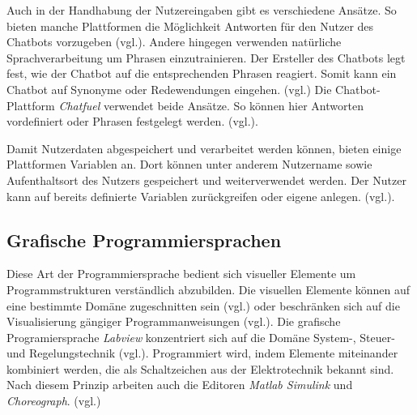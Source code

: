 Auch in der Handhabung der Nutzereingaben gibt es verschiedene Ansätze. So bieten manche Plattformen die Möglichkeit Antworten für den Nutzer des Chatbots vorzugeben (vgl.\cite{Chatfuel3:online}\cite{WelcomeM66:online}). Andere hingegen verwenden natürliche Sprachverarbeitung um Phrasen einzutrainieren. Der Ersteller des Chatbots legt fest, wie der Chatbot auf die entsprechenden Phrasen reagiert. Somit kann ein Chatbot auf Synonyme oder Redewendungen eingehen. (vgl.\cite{BotsifyC64:online}\cite{Dialogfl40:online}\cite{KatalogI56:online}) Die Chatbot-Plattform \emph{Chatfuel} verwendet beide Ansätze. So können hier Antworten vordefiniert oder Phrasen festgelegt werden. (vgl.\cite{Chatfuel3:online}). 

Damit Nutzerdaten abgespeichert und verarbeitet werden können, bieten einige Plattformen Variablen an. Dort können unter anderem Nutzername sowie Aufenthaltsort des Nutzers gespeichert und weiterverwendet werden. Der Nutzer kann auf bereits definierte Variablen zurückgreifen oder eigene anlegen. (vgl.\cite{Chatfuel3:online}\cite{Converse15:online}\cite{Dialogfl40:online}\cite{KatalogI56:online}\cite{WelcomeM66:online}). 


\subsection{Grafische Programmiersprachen}
Diese Art der Programmiersprache bedient sich visueller Elemente um Programmstrukturen verständlich abzubilden. Die visuellen Elemente können auf eine bestimmte Domäne zugeschnitten sein (vgl.\cite{WasistLa94:online}) oder beschränken sich auf die Visualisierung gängiger Programmanweisungen (vgl.\cite{BlocklyG57:online}). Die grafische Programiersprache \emph{Labview} konzentriert sich auf die Domäne System-, Steuer- und Regelungstechnik (vgl.\cite{WasistLa94:online}). Programmiert wird, indem Elemente miteinander kombiniert werden, die als Schaltzeichen aus der Elektrotechnik bekannt sind. Nach diesem Prinzip arbeiten auch die Editoren \emph{Matlab Simulink} und \emph{Choreograph}. (vgl.\cite{Choregra47:online}\cite{Simulink28:online})

